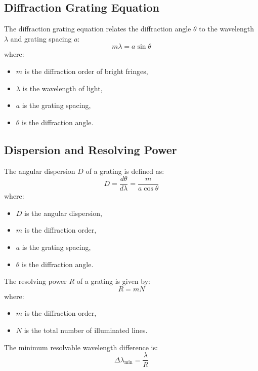\documentclass[journal]{IEEEtran}
\begin{document}
\subsection{Diffraction Grating Equation}
The diffraction grating equation relates the diffraction angle $\theta$ to the wavelength $\lambda$ and grating spacing $a$:
\begin{equation}
    m\lambda = a \sin\theta
    \label{eq:diffraction_grating}
\end{equation}
where:
\begin{itemize}
    \item $m$ is the diffraction order of bright fringes,
    \item $\lambda$ is the wavelength of light,
    \item $a$ is the grating spacing,
    \item $\theta$ is the diffraction angle.
\end{itemize}

\subsection{Dispersion and Resolving Power}
The angular dispersion $D$ of a grating is defined as:
\begin{equation}
    D = \frac{d\theta}{d\lambda} = \frac{m}{a \cos\theta}
    \label{eq:angular_dispersion}
\end{equation}
where:
\begin{itemize}
    \item $D$ is the angular dispersion,
    \item $m$ is the diffraction order,
    \item $a$ is the grating spacing,
    \item $\theta$ is the diffraction angle.
\end{itemize}

The resolving power $R$ of a grating is given by:
\begin{equation}
    R = mN
    \label{eq:resolving_power}
\end{equation}
where:
\begin{itemize}
    \item $m$ is the diffraction order,
    \item $N$ is the total number of illuminated lines.
\end{itemize}

The minimum resolvable wavelength difference is:
\begin{equation}
    \Delta\lambda_{\text{min}} = \frac{\lambda}{R}
    \label{eq:delta_lambda_min}
\end{equation}
 
\end{document}
